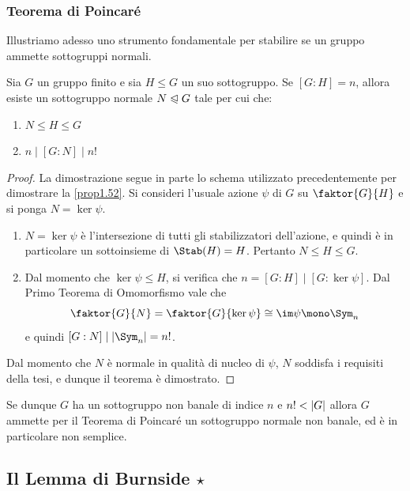 \documentclass[11pt]{scrartcl}
\begin{document}
	\subsubsection{Teorema di Poincaré}
	
	Illustriamo adesso uno strumento fondamentale per stabilire se un gruppo ammette sottogruppi normali.
	
	\begin{theorem}
		\label{teorema1.50}
		Sia $G$ un gruppo finito e sia $H \leqslant G$ un suo sottogruppo. 
		Se $[G:H] = n$, allora esiste un sottogruppo normale $N \trianglelefteqslant G$ 
		tale per cui che:
		\begin{enumerate}[(1)]
			\item $N \leqslant H \leqslant G$
			\item $n \mid [G:N] \mid n!$
		\end{enumerate}
	\end{theorem}
	
	\begin{proof}
		La dimostrazione segue in parte lo schema utilizzato precedentemente per
		dimostrare la \autoref{prop1.52}.
		Si consideri l'usuale azione $\psi$ di $G$ su $\faktor{G}{H}$ e si
		ponga $N = \ker \psi$.
		\begin{enumerate}[(1)]
			\item $N = \ker \psi$ è l'intersezione di tutti gli stabilizzatori dell'azione,
			e quindi è in particolare un sottoinsieme di $\Stab(H) = H$. Pertanto
			$N \leqslant H \leqslant G$.
			\item Dal momento che $\ker\psi \leqslant H$, si verifica che $n = [G:H] \mid [G:\ker\psi]$. Dal Primo Teorema di Omomorfismo vale che
			\[ \faktor{G}{N} = \faktor{G}{\ker\psi} \cong \im \psi \mono \Sym_n \]
			e quindi $[G : N] \mid \abs{\Sym_n} = n!$.
		\end{enumerate}
		Dal momento che $N$ è normale in qualità di nucleo di $\psi$, $N$ soddisfa i
		requisiti della tesi, e dunque il teorema è dimostrato.
	\end{proof}
	
	\begin{remark}
		Se dunque $G$ ha un sottogruppo non banale di indice $n$ e $n! < \left\lvert G \right\rvert$
		allora $G$ ammette per il Teorema di Poincaré un sottogruppo normale non banale, ed è in particolare non semplice.
	\end{remark}
	
	\newpage
	
	\subsection{Il Lemma di Burnside \texorpdfstring{$\star$}{★}}
	
\end{document}
